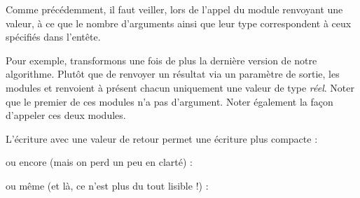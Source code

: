 	Comme précédemment, il faut veiller, lors de l’appel du module renvoyant
	une valeur, à ce que le nombre d’arguments ainsi que leur type
	correspondent à ceux spécifiés dans l’entête.

	Pour exemple, transformons une fois de plus la
	dernière version de notre algorithme.
	Plutôt que de renvoyer un résultat via un paramètre de sortie, 
	les modules  et
	 renvoient à présent 
	chacun uniquement une valeur de type \textit{réel}.
	Noter que le premier de ces modules n’a pas d’argument.
	Noter également la façon d’appeler ces deux modules.




	L'écriture avec une valeur de retour permet une
	écriture plus compacte :


	ou encore (mais on perd un peu en clarté) :


	ou même (et là, ce n'est plus du tout lisible !) :


